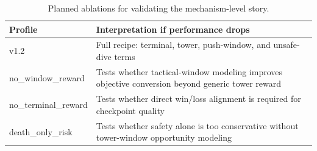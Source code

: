 \documentclass{article}
\begin{document}
\begin{table}[h]
  \centering
  \caption{Planned ablations for validating the mechanism-level story.}
  \begin{tabularx}{\linewidth}{>{\ttfamily}p{3.2cm}X}
    \toprule
    Profile & Interpretation if performance drops \\
    \midrule
    v1.2 & Full recipe: terminal, tower, push-window, and unsafe-dive terms \\
    no\_window\_reward & Tests whether tactical-window modeling improves objective conversion beyond generic tower reward \\
    no\_terminal\_reward & Tests whether direct win/loss alignment is required for checkpoint quality \\
    death\_only\_risk & Tests whether safety alone is too conservative without tower-window opportunity modeling \\
    \bottomrule
  \end{tabularx}
\end{table}
\end{document}
